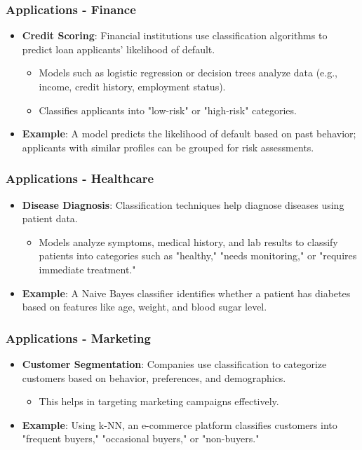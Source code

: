 \documentclass[aspectratio=169]{beamer}
\begin{document}
\begin{frame}[fragile]
    \frametitle{Applications - Finance}
    \begin{itemize}
        \item \textbf{Credit Scoring}: Financial institutions use classification algorithms to predict loan applicants' likelihood of default.
        \begin{itemize}
            \item Models such as logistic regression or decision trees analyze data (e.g., income, credit history, employment status).
            \item Classifies applicants into "low-risk" or "high-risk" categories.
        \end{itemize}
        \item \textbf{Example}: A model predicts the likelihood of default based on past behavior; applicants with similar profiles can be grouped for risk assessments.
    \end{itemize}
\end{frame}

\begin{frame}[fragile]
    \frametitle{Applications - Healthcare}
    \begin{itemize}
        \item \textbf{Disease Diagnosis}: Classification techniques help diagnose diseases using patient data.
        \begin{itemize}
            \item Models analyze symptoms, medical history, and lab results to classify patients into categories such as "healthy," "needs monitoring," or "requires immediate treatment."
        \end{itemize}
        \item \textbf{Example}: A Naive Bayes classifier identifies whether a patient has diabetes based on features like age, weight, and blood sugar level.
    \end{itemize}
\end{frame}

\begin{frame}[fragile]
    \frametitle{Applications - Marketing}
    \begin{itemize}
        \item \textbf{Customer Segmentation}: Companies use classification to categorize customers based on behavior, preferences, and demographics.
        \begin{itemize}
            \item This helps in targeting marketing campaigns effectively.
        \end{itemize}
        \item \textbf{Example}: Using k-NN, an e-commerce platform classifies customers into "frequent buyers," "occasional buyers," or "non-buyers."
    \end{itemize}
\end{frame}
\end{document}
